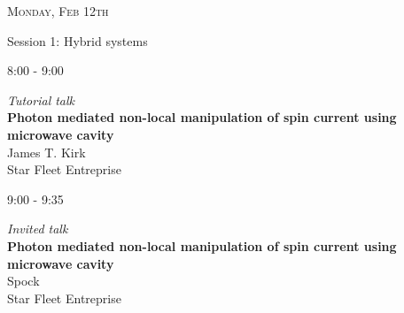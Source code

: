 \begin{tcolorbox}
\textsc{Monday, Feb 12th}
\end{tcolorbox}


{\noindent\color{babyblue}{\rule{16cm}{1mm}}}

Session 1: Hybrid systems

{\noindent\color{babyblue}{\rule{16cm}{1mm}}}

\begin{minipage}[t]{.2\textwidth} %
\vskip -8pt \color{red} 8:00 - 9:00
\end{minipage} %
\begin{minipage}[t]{.8\textwidth} %
\textit{Tutorial talk}\\ \vskip -8pt
\textbf{Photon mediated non-local manipulation of spin current using
microwave cavity} \\  \vskip -8pt
James T. Kirk\\
Star Fleet Entreprise\\
\end{minipage}

\begin{minipage}[t]{.2\textwidth} %
\vskip -8pt \color{red} 9:00 - 9:35
\end{minipage} %
\begin{minipage}[t]{.8\textwidth} %
\textit{Invited talk}\\ \vskip -8pt
\textbf{Photon mediated non-local manipulation of spin current using
microwave cavity} \\ \vskip -8pt
Spock\\
Star Fleet Entreprise\\
\end{minipage}



